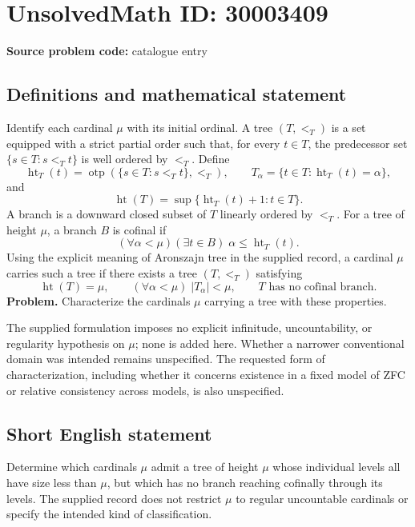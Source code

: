 \documentclass[11pt]{article}
\begin{document}
\section*{UnsolvedMath ID: 30003409}
\textbf{Source problem code:} catalogue entry
\subsection{Definitions and mathematical statement}
Identify each cardinal \(\mu\) with its initial ordinal. A tree \((T,<_{T})\) is a set equipped with a strict partial order such that, for every \(t\in T\), the predecessor set \(\{s\in T:s<_{T}t\}\) is well ordered by \(<_{T}\). Define
\[
\operatorname{ht}_{T}(t)=\operatorname{otp}(\{s\in T:s<_{T}t\},<_{T}),\qquad
T_{\alpha}=\{t\in T:\operatorname{ht}_{T}(t)=\alpha\},
\]
and
\[
\operatorname{ht}(T)=\sup\{\operatorname{ht}_{T}(t)+1:t\in T\}.
\]
A branch is a downward closed subset of \(T\) linearly ordered by \(<_{T}\). For a tree of height \(\mu\), a branch \(B\) is cofinal if
\[
(\forall\alpha<\mu)(\exists t\in B)\;\alpha\leq\operatorname{ht}_{T}(t).
\]
Using the explicit meaning of Aronszajn tree in the supplied record, a cardinal \(\mu\) carries such a tree if there exists a tree \((T,<_{T})\) satisfying
\[
\operatorname{ht}(T)=\mu,\qquad
(\forall\alpha<\mu)\;|T_{\alpha}|<\mu,
\qquad
T\text{ has no cofinal branch}.
\]
\textbf{Problem.} Characterize the cardinals \(\mu\) carrying a tree with these properties.

The supplied formulation imposes no explicit infinitude, uncountability, or regularity hypothesis on \(\mu\); none is added here. Whether a narrower conventional domain was intended remains unspecified. The requested form of characterization, including whether it concerns existence in a fixed model of ZFC or relative consistency across models, is also unspecified.
\subsection{Short English statement}
Determine which cardinals \(\mu\) admit a tree of height \(\mu\) whose individual levels all have size less than \(\mu\), but which has no branch reaching cofinally through its levels. The supplied record does not restrict \(\mu\) to regular uncountable cardinals or specify the intended kind of classification.
\end{document}
